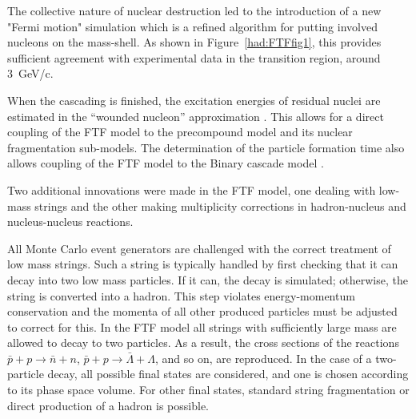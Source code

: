The collective nature of nuclear destruction led to the introduction of a new
"Fermi motion" \cite{hadbib:FTF9,hadbib:FTF10} simulation which is a refined 
algorithm for putting involved nucleons on the mass-shell.  As shown in 
Figure~\ref{had:FTFfig1}, this provides sufficient agreement with experimental
data in the transition region, around 3~GeV/c.

When the cascading is finished, the excitation energies of residual nuclei are
estimated in the ``wounded nucleon'' approximation \cite{hadbib:FTF11}. This 
allows for a direct coupling of the FTF model to the \Gfour{} precompound model
and its nuclear fragmentation sub-models.  The determination of the particle
formation time also allows coupling of the FTF model to the \Gfour{} Binary 
cascade model \cite{hadbib:FTF12}.




Two additional innovations were made in the FTF model, one dealing with low-mass
strings and the other making multiplicity corrections in hadron-nucleus and
nucleus-nucleus reactions.
   
All Monte Carlo event generators are challenged with the correct treatment 
of low mass strings. Such a string is typically handled by first checking that
it can decay into two low mass particles. If it can, the decay is simulated;
otherwise, the string is converted into a hadron.  This step violates 
energy-momentum conservation and the momenta of all other produced particles
must be adjusted to correct for this.  In the FTF model all strings with 
sufficiently large mass are allowed to decay to two particles.  As a result, the
cross sections of the reactions $\bar p+p \rightarrow \bar n+n$, 
$\bar p+p \rightarrow \bar \Lambda+\Lambda$, and so on, are reproduced. In the 
case of a two-particle decay, all possible final states are considered, and one 
is chosen according to its phase space volume. For other final states, standard 
string fragmentation or direct production of a hadron is possible.  


